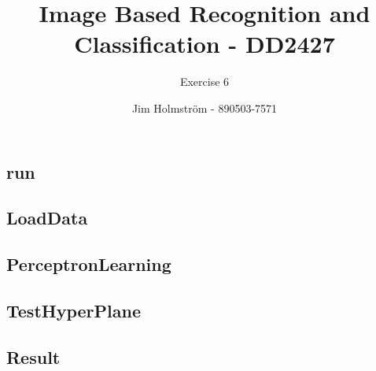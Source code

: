 \documentclass[a4paper,twoside=false,abstract=false,numbers=noenddot,
titlepage=false,headings=small,parskip=half,version=last]{scrartcl}
\author{Jim Holmström - 890503-7571}
\title{Image Based Recognition and Classification - DD2427}
\subtitle{Exercise 6}
\theoremstyle{definition}
\theoremstyle{remark}
\begin{document}
\maketitle
\thispagestyle{empty}

\subsection{run}
    

\subsection{LoadData}
    

\subsection{PerceptronLearning}
    

\subsection{TestHyperPlane}
    

\subsection{Result}
    
\end{document}

